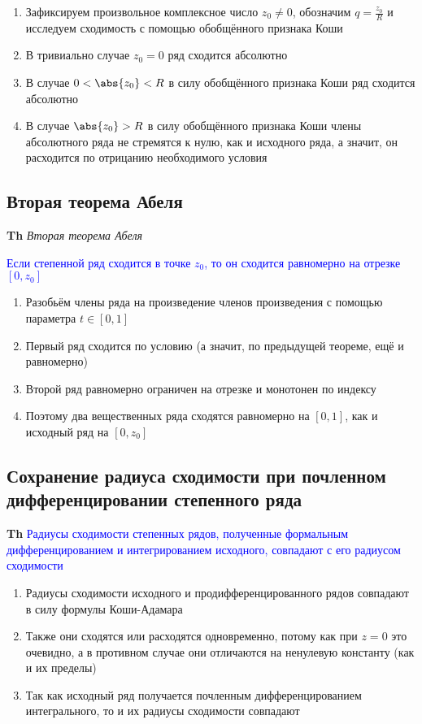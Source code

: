 \begin{enumerate}
    \item Зафиксируем произвольное комплексное число $z_0 \neq 0$, обозначим $q = \frac{z_0}{R}$ и исследуем
    сходимость с помощью обобщённого признака Коши
    \item В тривиально случае $z_0 = 0$ ряд сходится абсолютно
    \item В случае $0 < \abs{z_0} < R$ в силу обобщённого признака Коши ряд сходится абсолютно
    \item В случае $\abs{z_0} > R$ в силу обобщённого признака Коши члены абсолютного ряда не стремятся к нулю,
    как и исходного ряда, а значит, он расходится по отрицанию необходимого условия
\end{enumerate}

\subsection{Вторая теорема Абеля}

\textbf{Th} \textit{Вторая теорема Абеля}

\textcolor{blue}{Если степенной ряд сходится в точке $z_0$, то он сходится равномерно на отрезке $[0, z_0]$}

\begin{enumerate}
    \item Разобьём члены ряда на произведение членов произведения с помощью параметра $t \in [0, 1]$
    \item Первый ряд сходится по условию (а значит, по предыдущей теореме, ещё и равномерно)
    \item Второй ряд равномерно ограничен на отрезке и монотонен по индексу
    \item Поэтому два вещественных ряда сходятся равномерно на $[0, 1]$, как и исходный ряд на $[0, z_0]$
\end{enumerate}

\subsection{Сохранение радиуса сходимости при почленном дифференцировании степенного ряда}

\textbf{Th} \textcolor{blue}{Радиусы сходимости степенных рядов, полученные формальным дифференцированием и
интегрированием исходного, совпадают с его радиусом сходимости}

\begin{enumerate}
    \item Радиусы сходимости исходного и продифференцированного рядов совпадают в силу формулы Коши-Адамара
    \item Также они сходятся или расходятся одновременно, потому как при $z = 0$ это очевидно, а в противном
    случае они отличаются на ненулевую константу (как и их пределы)
    \item Так как исходный ряд получается почленным дифференцированием интегрального, то и их радиусы сходимости
    совпадают
\end{enumerate}

